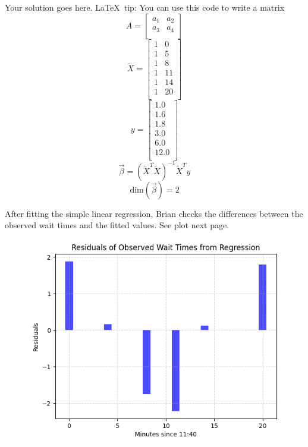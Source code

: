 \documentclass[11pt,addpoints,answers]{exam}
\begin{document}
\begin{questions}
\begin{parts}
  \begin{solutionorbox}[2in]
    Your solution goes here.  \LaTeX\ tip: You can use this code to write a matrix
    \begin{equation}
      A = \begin{bmatrix} 
        a_1 & a_2 \\ 
        a_3 & a_4 \\ 
    \end{bmatrix}  
  \end{equation}
  \begin{equation}
    \tilde{X}=\begin{bmatrix} 
      1 & 0 \\ 
      1 & 5 \\ 
      1 & 8 \\ 
      1 & 11 \\ 
      1 & 14 \\ 
      1 & 20 \\ 
    \end{bmatrix}
  \end{equation}
  \begin{equation}
    y=\begin{bmatrix}
      1.0 \\
      1.6 \\
      1.8 \\
      3.0 \\
      6.0 \\
      12.0 \\
    \end{bmatrix}
  \end{equation}
  \[ \vec{\beta} = (\tilde{X}^T\tilde{X})^{-1}\tilde{X}^Ty \]
  \[ \text{dim}(\vec{\beta}) = 2 \]
  \end{solutionorbox}

  \newpage
After fitting the simple linear regression, Brian checks the differences between the observed wait times and the fitted values. See plot next page.

\begin{figure}[!h]
    \centering
    \includegraphics[width=0.65\linewidth]{figure_2.png}
    \label{fig:residuals}
\end{figure}


\end{parts}
\end{questions}
\end{document}
